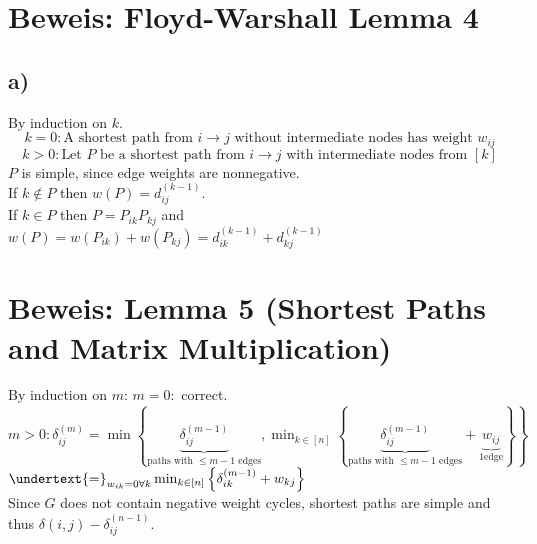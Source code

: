 \documentclass[12pt,oneside,a4paper,parskip=on,fleqn]{scrartcl}
\begin{document}
\section*{Beweis: Floyd-Warshall Lemma 4}
\subsection*{a)}
By induction on $k$.
$$k=0: \text{A shortest path from } i\to j \text{ without intermediate nodes has weight } w_{ij}$$
$$k>0: \text{Let } P \text{ be a shortest path from } i\to j \text{ with intermediate nodes from } [k]$$
$P$ is simple, since edge weights are nonnegative.\\
If $k\not\in P$ then $w(P) = d_{ij}^{(k-1)}$.\\
If $k\in P$ then $P=P_{ik} P_{kj}$ and\\
$w(P) = w(P_{ik}) + w(P_{kj}) = d_{ik}^{(k-1)} + d_{kj}^{(k-1)}$

\section*{Beweis: Lemma 5 (Shortest Paths and Matrix Multiplication)}
By induction on $m$:
$m=0:$ correct.\\
$m>0: \delta_{ij}^{(m)} = \min\left\{\underbrace{\delta_{ij}^{(m-1)}}_{\text{paths with }\leq m-1\text{ edges}}, \min_{k\in[n]} \left\{\underbrace{\delta_{ij}^{(m-1)}}_{\text{paths with } \leq m-1\text{ edges}} + \underbrace{w_{ij}}_{1 \text{edge}}\right\}\right\}$ \\
$\undertext{=}_{w_{ik}=0 \forall k} \min_{k\in[n]} \left\{ \delta_{ik}^{(m-1)} + w_{kj} \right\}$\\
Since $G$ does not contain negative weight cycles, shortest paths are simple and thus $\delta(i,j) - \delta_{ij}^{(n-1)}$.
\end{document}
